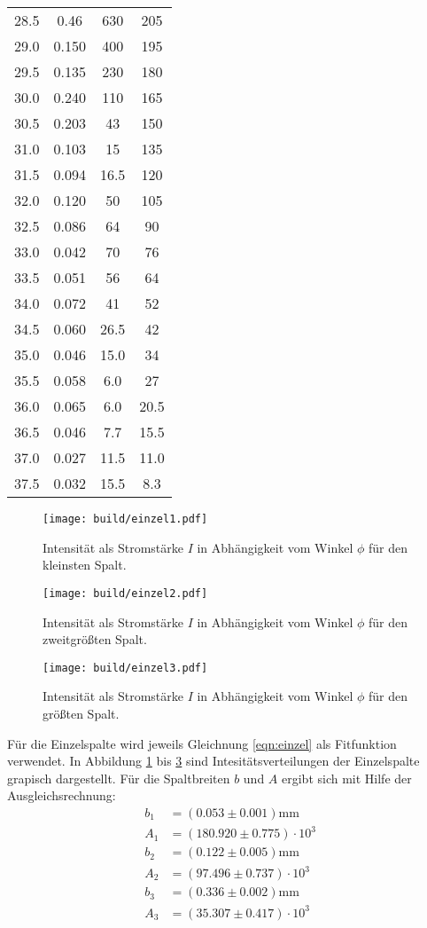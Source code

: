 \begin{table}
\begin{tabular}{c c c c}
28.5 & 0.46 & 630 & 205 \\
29.0 & 0.150 & 400 & 195 \\
29.5 & 0.135 & 230 & 180 \\
30.0 & 0.240 & 110 & 165 \\
30.5 & 0.203 & 43 & 150 \\
31.0 & 0.103 & 15 & 135 \\
31.5 & 0.094 & 16.5 & 120 \\
32.0 & 0.120 & 50 & 105 \\
32.5 & 0.086 & 64 & 90 \\
33.0 & 0.042 & 70 & 76 \\
33.5 & 0.051 & 56 & 64 \\
34.0 & 0.072 & 41 & 52 \\
34.5 & 0.060 & 26.5 & 42 \\
35.0 & 0.046 & 15.0 & 34 \\
35.5 & 0.058 & 6.0 & 27 \\
36.0 & 0.065 & 6.0  & 20.5 \\
36.5 & 0.046 & 7.7  & 15.5 \\
37.0 & 0.027 & 11.5 & 11.0 \\
37.5 & 0.032 & 15.5 & 8.3 \\
\bottomrule
\end{tabular}
\end{table}

\begin{figure}
  \centering
  \texttt{[image: build/einzel1.pdf]}
  \caption{Intensität als Stromstärke $I$ in Abhängigkeit vom Winkel $\phi$ für den kleinsten Spalt.}
  \label{fig:einzel1}
\end{figure}

\begin{figure}
  \centering
  \texttt{[image: build/einzel2.pdf]}
  \caption{Intensität als Stromstärke $I$ in Abhängigkeit vom Winkel $\phi$ für den zweitgrößten Spalt.}
  \label{fig:einzel2}
\end{figure}

\begin{figure}
  \centering
  \texttt{[image: build/einzel3.pdf]}
  \caption{Intensität als Stromstärke $I$ in Abhängigkeit vom Winkel $\phi$ für den größten Spalt.}
  \label{fig:einzel3}
\end{figure}

Für die Einzelspalte wird jeweils Gleichnung \ref{eqn:einzel} als Fitfunktion verwendet. In Abbildung \ref{fig:einzel1} bis \ref{fig:einzel3} sind Intesitätsverteilungen der Einzelspalte grapisch dargestellt.
Für die Spaltbreiten $b$ und $A$ ergibt sich mit Hilfe der Ausgleichsrechnung:
\begin{align}
  b_1 &= (0.053 \pm 0.001) \si{\milli\meter} \\
  A_1 &= (180.920 \pm 0.775)\cdot10^{3} \\
  b_2 &= (0.122 \pm 0.005)  \si{\milli\meter}\\
  A_2 &= (97.496 \pm 0.737)\cdot 10^{3} \\
   b_3 &= (0.336 \pm 0.002) \si{\milli\meter} \\
  A_3 &= (35.307 \pm 0.417)\cdot 10^{3}
\end{align}

